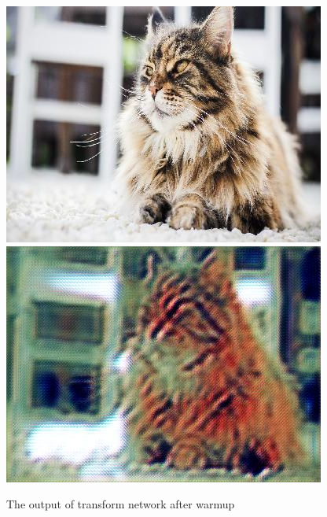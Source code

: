 \documentclass[10pt,twocolumn,letterpaper]{article}
\begin{document}
\begin{figure}[t]
\begin{center}
\includegraphics[width=0.45\linewidth]{input.jpg} \includegraphics[width=0.45\linewidth]{0.jpg}	
\end{center}
   \caption{The output of transform network after warmup}
\label{fig:long}
\label{fig:onecol}
\end{figure}
{\small


}
\end{document}
